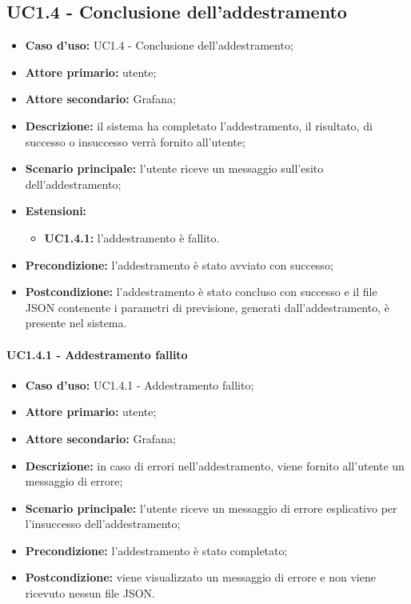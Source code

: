 \documentclass{article}
\begin{document}
	\subsection{UC1.4 - Conclusione dell'addestramento}
	\begin{itemize}
		\item \textbf{Caso d’uso:} UC1.4 - Conclusione dell'addestramento;
		\item \textbf{Attore primario:} utente;
		\item \textbf{Attore secondario:} Grafana\glo;
		\item \textbf{Descrizione:} il sistema ha completato l'addestramento, il risultato, di successo o insuccesso verrà fornito all'utente;
		\item \textbf{Scenario principale:} l'utente riceve un messaggio sull'esito dell'addestramento;
		\item \textbf{Estensioni:}
			\begin{itemize}
				\item \textbf{UC1.4.1:} l'addestramento è fallito.
			\end{itemize}
		\item \textbf{Precondizione:} l'addestramento è stato avviato con successo;
		\item \textbf{Postcondizione:} l'addestramento è stato concluso con successo e il file JSON contenente i parametri di previsione, generati dall'addestramento, è presente nel sistema.
	\end{itemize}

	\paragraph{UC1.4.1 - Addestramento fallito}
	\begin{itemize}
		\item \textbf{Caso d’uso:} UC1.4.1 - Addestramento fallito;
		\item \textbf{Attore primario:} utente;
		\item \textbf{Attore secondario:} Grafana\glo;
		\item \textbf{Descrizione:} in caso di errori nell'addestramento, viene fornito all'utente un messaggio di errore;
		\item \textbf{Scenario principale:} l'utente riceve un messaggio di errore esplicativo per l'insuccesso dell'addestramento;
		\item \textbf{Precondizione:} l'addestramento è stato completato;
		\item \textbf{Postcondizione:} viene visualizzato un messaggio di errore e non viene ricevuto nessun file JSON.
	\end{itemize}
\end{document}
